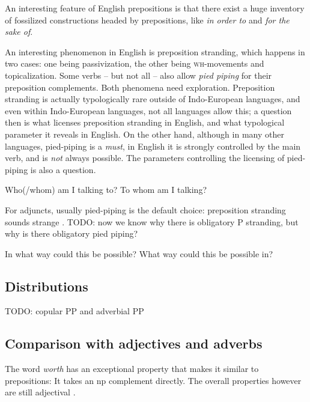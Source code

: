 \documentclass[UTF8, a4paper, oneside, scheme=plain, 12pt]{ctexbook}
\newcommand*{\citepage}[1]{p.~{#1}}
\newcommand*{\term}[1]{\emph{#1}}
\newcommand{\form}[1]{\emph{#1}}
\newcommand{\category}[1]{\textsc{#1}}
\begin{document}
An interesting feature of English prepositions 
is that there exist a huge inventory of fossilized constructions 
headed by prepositions, 
like \form{in order to} and \form{for the sake of}.

An interesting phenomenon in English is preposition stranding,
which happens in two cases: 
one being passivization, the other being 
\category{wh}-movements and topicalization.
Some verbs -- but not all -- also allow \term{pied piping} for their preposition complements.
Both phenomena need exploration.
Preposition stranding is actually typologically rare 
outside of Indo-European languages, 
and even within Indo-European languages, not all languages allow this;
a question then is  what licenses preposition stranding in English, 
and what typological parameter it reveals in English.
On the other hand, although in many other languages, 
pied-piping is a \emph{must}, 
in English it is strongly controlled by the main verb, 
and is \emph{not} always possible.
The parameters controlling the licensing of pied-piping is also a question.

\begin{exe}
    \ex Who(/whom) am I talking to?
    \ex To whom am I talking?
\end{exe}

For adjuncts, usually pied-piping is the default choice: 
preposition stranding sounds strange \citep[\citepage{265}]{sportiche2013introduction}.
TODO: now we know why there is obligatory P stranding, 
but why is there obligatory pied piping?

\begin{exe}
    \ex In what way could this be possible?
    \ex *What way could this be possible in?
\end{exe}

\subsection{Distributions}

TODO: copular PP and adverbial PP

\subsection{Comparison with adjectives and adverbs}

The word \form{worth} has an exceptional property
that makes it similar to prepositions:
It takes an \acs{np} complement directly.
The overall properties however are still adjectival \citep[\citepage{607}]{cgel}.
\end{document}
